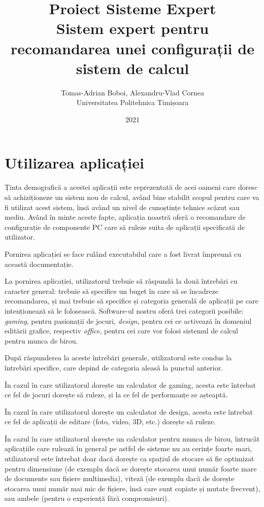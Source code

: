 \documentclass[12pt]{article}
\author{Tomas-Adrian Boboi, Alexandru-Vlad Cornea\\ Universitatea Politehnica Timișoara}
\date{2021}
\title{Proiect Sisteme Expert\\ \Large{Sistem expert pentru recomandarea unei configurații de sistem de calcul}}
\begin{document}
    
    \maketitle
    \thispagestyle{empty}
    \pagebreak

    \tableofcontents
    \pagebreak

    \section{Utilizarea aplicației}
    Ținta demografică a acestei aplicații este reprezentată de acei oameni care doresc să achiziționeze un sistem nou de calcul, având bine stabilit scopul pentru care va fi utilizat acest sistem, însă având un nivel de cunoștințe tehnice scăzut sau mediu. Având în minte aceste fapte, aplicația noastră oferă o recomandare de configurație de componente PC care să ruleze suita de aplicații specificată de utilizator.

    Pornirea aplicației se face rulând executabilul care a fost livrat împreună cu această documentație.

    La pornirea aplicației, utilizatorul trebuie să răspundă la două întrebări cu caracter general: trebuie să specifice un buget în care să se încadreze recomandarea, și mai trebuie să specifice și categoria generală de aplicații pe care intenționează să le folosească. Software-ul nostru oferă trei categorii posibile: \textit{gaming}, pentru pasionații de jocuri, \textit{design}, pentru cei ce activează în domeniul editării grafice, respectiv \textit{office}, pentru cei care vor folosi sistemul de calcul pentru munca de birou.

    După răspunderea la aceste întrebări generale, utilizatorul este condus la întrebări specifice, care depind de categoria aleasă la punctul anterior.

    În cazul în care utilizatorul dorește un calculator de gaming, acesta este întrebat ce fel de jocuri dorește să ruleze, și la ce fel de performanțe se așteaptă.

    În cazul în care  utilizatorul dorește un calculator de design, acesta este întrebat ce fel de aplicații de editare (foto, video, 3D, etc.) dorește să ruleze.

    În cazul în care  utilizatorul dorește un calculator pentru munca de birou, întrucât aplicațiile care rulează în general pe astfel de sisteme nu au cerințe foarte mari, utilizatorul este întrebat doar dacă dorește ca spațiul de stocare să fie optimizat pentru dimensiune (de exemplu dacă se dorește stocarea unui număr foarte mare de documente sau fișiere multimedia), viteză (de exemplu dacă de dorește stocarea unui număr mai mic de fișiere, însă care sunt copiate și mutate frecvent), sau ambele (pentru o experiență fără compromisuri).
    \pagebreak
\end{document}

